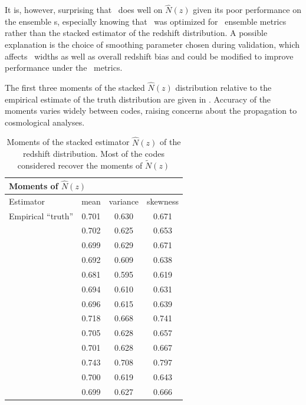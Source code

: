 It is, however, surprising that \tpz\ does well on $\hat{N}(z)$ given its poor performance on the ensemble \pzpdf s, especially knowing that \tpz\ was optimized for \pzpdf\ ensemble metrics rather than the stacked estimator of the redshift distribution.
A possible explanation is the choice of smoothing parameter chosen during validation, which affects \pzpdf\ widths as well as overall redshift bias and could be modified to improve performance under the \pzpdf\ metrics.

The first three moments of the stacked $\hat{N}(z)$ distribution relative to the empirical estimate of the truth distribution are given in .
Accuracy of the moments varies widely between codes, raising concerns about the propagation to cosmological analyses.

\begin{table}
	\setlength{\tabcolsep}{2pt}
	\caption{Moments of the stacked estimator $\hat{N}(z)$ of the redshift distribution.
		Most of the codes considered recover the moments of $\tilde{N}(z)$}
	\begin{tabular}{lccc}
		\hline
		\hline
		\multicolumn{4}{l}{Moments of $\hat{N}(z)$} \\
		\hline
		Estimator  & mean       & variance    & skewness \\
		Empirical ``truth'' & 0.701 & 0.630 & 0.671  \\
		\hline
		\annz       & 0.702      & 0.625      & 0.653    \\
		\bpz        & 0.699      & 0.629      & 0.671    \\
		\delight    & 0.692      & 0.609      & 0.638    \\
		\eazy       & 0.681      & 0.595      & 0.619    \\
		\flexzboost & 0.694      & 0.610      & 0.631    \\
		\gpz        & 0.696      & 0.615      & 0.639    \\
		\lephare    & 0.718      & 0.668      & 0.741    \\
		\metaphor   & 0.705      & 0.628      & 0.657    \\
		\cmnn       & 0.701      & 0.628      & 0.667    \\
		\skynet     & 0.743      & 0.708      & 0.797    \\
		\tpz        & 0.700      & 0.619      & 0.643    \\
		\hline
		\trainz	    & 0.699 		 & 0.627 	    & 0.666 \\
	\end{tabular}
\end{table}

